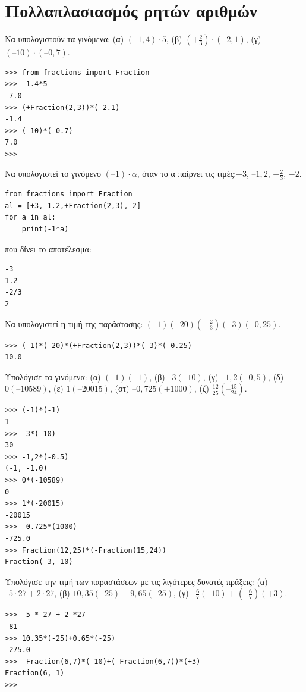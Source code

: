 \section{Πολλαπλασιασμός ρητών αριθμών}
\begin{exercise}
Nα	υπολογιστούν	τα	γινόμενα:	(α)	$(–1,4)\cdot 5$,		(β)	$\left(+ \frac{2}{3}\right)\cdot(–2,1)$,			(γ)	$(–10)\cdot(–0,7)$.
\end{exercise}
\begin{lstlisting}
>>> from fractions import Fraction
>>> -1.4*5
-7.0
>>> (+Fraction(2,3))*(-2.1)
-1.4
>>> (-10)*(-0.7)
7.0
>>>
\end{lstlisting}
\begin{exercise}
Nα	υπολογιστεί	το	γινόμενο	$(–1)\cdot α$,	όταν	το	α	παίρνει	τις	τιμές:$+3$,	$–1,2$,	$+\frac{2}{3}$, $-2$.
\end{exercise}
\begin{lstlisting}
from fractions import Fraction
al = [+3,-1.2,+Fraction(2,3),-2]
for a in al:
    print(-1*a)
\end{lstlisting}
που δίνει το αποτέλεσμα:
\begin{lstlisting}
-3
1.2
-2/3
2
\end{lstlisting}
\begin{exercise}
Να	υπολογιστεί	η	τιμή	της	παράστασης:	$(–1)(–20)(+ \frac{2}{3} )(–3)(–0,25)$.
\end{exercise}
\begin{lstlisting}
>>> (-1)*(-20)*(+Fraction(2,3))*(-3)*(-0.25)
10.0
\end{lstlisting}
\begin{exercise}
 Υπολόγισε	τα	γινόμενα:	(α)	$(–1)(–1)$,	(β)	$–3(–10)$,	(γ)	$–1,2(–0,5)$,	(δ)	$0(–10589)$,
(ε)	$1(–20015)$,	(στ)	$–0,725(+1000)$,	(ζ)	 $\frac{12}{25} \left(–\frac{ 15}{24}\right)$.
\end{exercise}
\begin{lstlisting}
>>> (-1)*(-1)
1
>>> -3*(-10)
30
>>> -1,2*(-0.5)
(-1, -1.0)
>>> 0*(-10589)
0
>>> 1*(-20015)
-20015
>>> -0.725*(1000)
-725.0
>>> Fraction(12,25)*(-Fraction(15,24))
Fraction(-3, 10)
\end{lstlisting}
\begin{exercise}
Υπολόγισε	την	τιμή	των	παραστάσεων	με	τις	λιγότερες	δυνατές	πράξεις:
(α)	$–5\cdot 27	+	2\cdot 27$,		(β)	$10,35(–25)	+	9,65(–25)$,		(γ)	$– \frac{6}{7} (–10)+(–\frac{6}{7} )(+3)$.
\end{exercise}
\begin{lstlisting}
>>> -5 * 27 + 2 *27
-81
>>> 10.35*(-25)+0.65*(-25)
-275.0
>>> -Fraction(6,7)*(-10)+(-Fraction(6,7))*(+3)
Fraction(6, 1)
>>>
\end{lstlisting}
